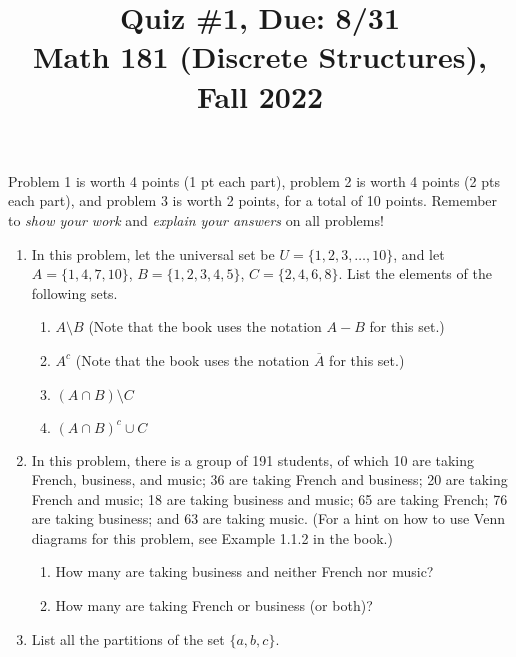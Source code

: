 \documentclass[11pt]{article}
\title{Quiz \#1, Due: 8/31 \\Math 181 (Discrete Structures), Fall 2022}
\date{}
\begin{document}
\maketitle

\thispagestyle{empty}

\vspace{-1cm}

Problem 1 is worth 4 points (1 pt each part), problem 2 is worth 4 points (2 pts each part), and problem 3 is worth 2 points, for a total of 10 points. Remember to \emph{show your work} and \emph{explain your answers} on all problems!

\begin{enumerate}
\item In this problem, let the universal set be $U=\{1,2,3,\ldots,10\}$, and let $A=\{1,4,7,10\}$, $B=\{1,2,3,4,5\}$,  $C=\{2,4,6,8\}$. List the elements of the following sets.

\begin{enumerate}
\item $A \setminus B$ \hfill (Note that the book uses the notation $A-B$ for this set.)
\item $A^c$ \hfill (Note that the book uses the notation $\overline{A}$ for this set.)
\item $(A\cap B) \setminus C$
\item $(A \cap B)^c \cup C$
\end{enumerate}

\item In this problem, there is a group of 191 students, of which 10 are taking French, business, and music; 36 are taking French and business; 20 are taking French and music; 18 are taking business and music; 65 are taking French; 76 are taking business; and 63 are taking music. (For a hint on how to use Venn diagrams for this problem, see Example 1.1.2 in the book.)

\begin{enumerate}
\item How many are taking business and neither French nor music?
\item How many are taking French or business (or both)?
\end{enumerate}

\item List all the partitions of the set $\{a,b,c\}$.

\end{enumerate}
\end{document}
